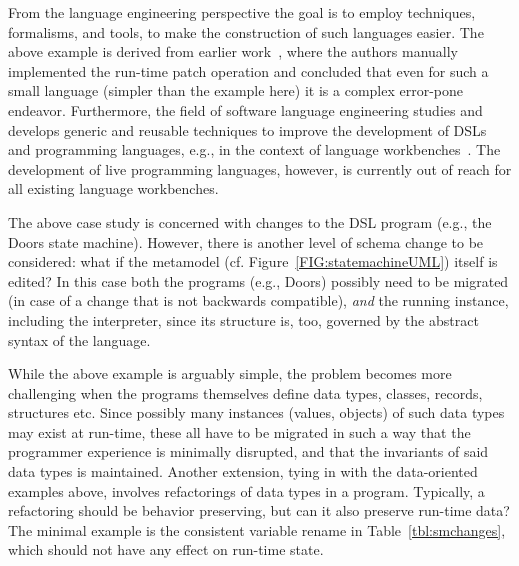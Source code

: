 \documentclass[english,submission]{programming}
\begin{document}
From the language engineering perspective the goal is to employ techniques, formalisms, and tools, to make the construction of such languages easier. The above example is derived from earlier work~\cite{vanRozen19}, where the authors manually implemented the run-time patch operation and concluded that even for such a small language (simpler than the example here) it is a complex error-pone endeavor. Furthermore, the field of software language engineering studies and develops generic and reusable techniques to improve the development of DSLs and programming languages, e.g., in the context of language workbenches~\cite{ERDWEG201524}. The development of live programming languages, however, is currently out of reach for all existing language workbenches.

The above case study is concerned with changes to the DSL program (e.g., the Doors state machine). However, there is another level of schema change to be considered: what if the metamodel (cf. Figure~\ref{FIG:statemachineUML}) itself is edited? In this case both the programs (e.g., Doors) possibly need to be migrated (in case of a change that is not backwards compatible), \textit{and} the running instance, including the interpreter, since its structure is, too, governed by the abstract syntax of the language.


While the above example is arguably simple, the problem becomes more challenging when the programs themselves define data types, classes, records, structures etc. Since possibly many instances (values, objects) of such data types may exist at run-time, these all have to be migrated in such a way that the programmer experience is minimally disrupted, and that the invariants of said data types is maintained.
Another extension, tying in with the data-oriented examples above, involves refactorings of data types in a program. Typically, a refactoring should be behavior preserving, but can it also preserve run-time data? The minimal example is the consistent variable rename in Table~\ref{tbl:smchanges}, which should not have any effect on run-time state.
\end{document}
